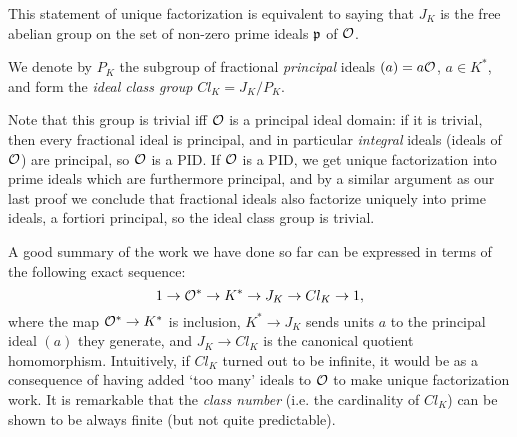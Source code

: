 This statement of unique factorization is equivalent to saying that $J_K$ is the free abelian group on the set of non-zero prime ideals $\mathfrak{p}$ of $\mathcal{O}$.

\begin{defn}
	We denote by $P_K$ the subgroup of fractional \emph{principal} ideals $(a)=a\mathcal{O}$, $a\in K^*$, and form the \emph{ideal class group} $Cl_K=J_K/P_K$.
\end{defn}

Note that this group is trivial iff $\mathcal{O}$ is a principal ideal domain: if it is trivial, then every fractional ideal is principal, and in particular \emph{integral} ideals (ideals of $\mathcal{O}$) are principal, so $\mathcal{O}$ is a PID. If $\mathcal{O}$ is a PID, we get unique factorization into prime ideals which are furthermore principal, and by a similar argument as our last proof we conclude that fractional ideals also factorize uniquely into prime ideals, a fortiori principal, so the ideal class group is trivial.

A good summary of the work we have done so far can be expressed in terms of the following exact sequence:
\[
	1 \to \mathcal{O}^* \to K^* \to J_K \to Cl_K \to 1,
\]
where the map $\mathcal{O}^*\to K^*$ is inclusion, $K^*\to J_K$ sends units $a$ to the principal ideal $(a)$ they generate, and $J_K\to Cl_K$ is the canonical quotient homomorphism. Intuitively, if $Cl_K$ turned out to be infinite, it would be as a consequence of having added `too many' ideals to $\mathcal{O}$ to make unique factorization work. It is remarkable that the \emph{class number} (i.e. the cardinality of $Cl_K$) can be shown to be always finite (but not quite predictable).
